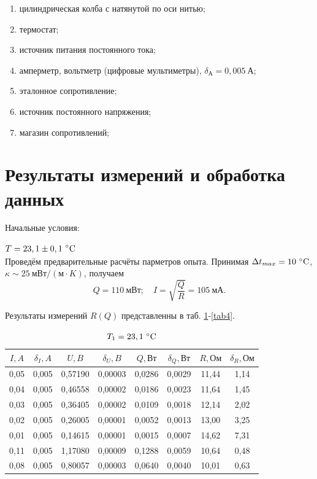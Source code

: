 \documentclass[a4paper, 12pt]{article}
\begin{document}
\begin{enumerate}
    \item цилиндрическая колба с натянутой по оси нитью;
    \item термостат;
    \item источник питания постоянного тока;
    \item амперметр, вольтметр (цифровые мультиметры), $\delta_{А} = 0,005~А$;
    \item эталонное сопротивление;
    \item источник постоянного напряжения;
    \item магазин сопротивлений;
\end{enumerate}

\section{Результаты измерений и обработка данных}

Начальные условия:

$\begin{aligned}
& T = 23,1\pm0,1~\celsius
\end{aligned}$\\[0,5 cm]

Проведём предварительные расчёты парметров опыта. Принимая $\Delta{t_{max}} = 10~\celsius$, \\ $\kappa \sim 25~мВт/(м\cdot{K})$, получаем $$Q = 110~мВт; \quad I = \sqrt{\frac{Q}{R}} = 105~мА.$$

Результаты измерений $R(Q)$ представленны в таб. \ref{tab1}-\ref{tab4}.

\begin{table}[h!]
\begin{center}
\begin{tabular}{|c|c|c|c|c|c|c|c|}
\hline
$I, A$ & $\delta_I, A$ & $U, B$  & $\delta_U, B$ & $Q, Вт$ & $\delta_Q, Вт$ & $R, Ом$ & $\delta_R, Ом$ \\ \hline
0,05   & 0,005         & 0,57190 & 0,00003       & 0,0286  & 0,0029         & 11,44   & 1,14           \\ \hline
0,04   & 0,005         & 0,46558 & 0,00002       & 0,0186  & 0,0023         & 11,64   & 1,45           \\ \hline
0,03   & 0,005         & 0,36405 & 0,00002       & 0,0109  & 0,0018         & 12,14   & 2,02           \\ \hline
0,02   & 0,005         & 0,26005 & 0,00001       & 0,0052  & 0,0013         & 13,00   & 3,25           \\ \hline
0,01   & 0,005         & 0,14615 & 0,00001       & 0,0015  & 0,0007         & 14,62   & 7,31           \\ \hline
0,11   & 0,005         & 1,17080 & 0,00009       & 0,1288  & 0,0059         & 10,64   & 0,48           \\ \hline
0,08   & 0,005         & 0,80057 & 0,00003       & 0,0640  & 0,0040         & 10,01   & 0,63           \\ \hline
\end{tabular}
\caption{$T_1 = 23,1~\celsius$}
\label{tab1}
\end{center}
\end{table}
\end{document}
